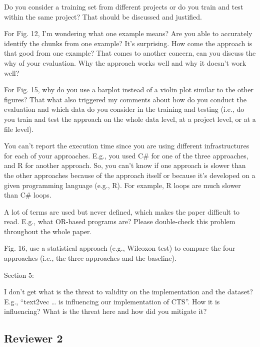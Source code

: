 \documentclass[10pt,a4wide]{article}
\renewenvironment{leftbar}{%
	\vspace{0.1cm}
	\def\FrameCommand{\vrule width 0.4pt \hspace{15pt}}%
	\MakeFramed {\advance\hsize-\width \FrameRestore}}%
{\endMakeFramed\vspace{0.1cm}}
\begin{document}
\begin{leftbar}
Do you consider a training set from different projects or do you train and test within the same project? That should be discussed and justified.

For Fig. 12, I’m wondering what one example means? Are you able to accurately identify the chunks from one example? It’s surprising. How come the approach is that good from one example? That comes to another concern, can you discuss the why of your evaluation. Why the approach works well and why it doesn’t work well?

For Fig. 15, why do you use a barplot instead of a violin plot similar to the other figures? That what also triggered my comments about how do you conduct the evaluation and which data do you consider in the training and testing (i.e., do you train and test the approach on the whole data level, at a project level, or at a file level).

You can’t report the execution time since you are using different infrastructures for each of your approaches. E.g., you used C\# for one of the three approaches, and R for another approach. So, you can’t know if one approach is slower than the other approaches because of the approach itself or because it’s developed on a given programming language (e.g., R). For example, R loops are much slower than C\# loops.

A lot of terms are used but never defined, which makes the paper difficult to read. E.g., what OR-based programs are? Please double-check this problem throughout the whole paper.

Fig. 16, use a statistical approach (e.g., Wilcoxon test) to compare the four approaches (i.e., the three approaches and the baseline).

Section 5:

I don’t get what is the threat to validity on the implementation and the dataset? E.g., “text2vec … is influencing our implementation of CTS”. How it is influencing? What is the threat here and how did you mitigate it?
\end{leftbar}

\subsection*{Reviewer 2}
\end{document}

